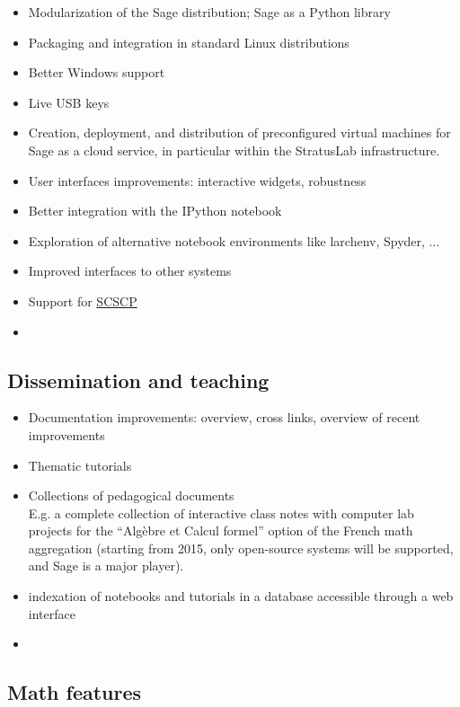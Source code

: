 \begin{itemize}
\item Modularization of the Sage distribution; Sage as a Python library
\item Packaging and integration in standard Linux distributions
\item Better Windows support
\item Live USB keys
\item Creation, deployment, and distribution of preconfigured virtual
  machines for Sage as a cloud service, in particular within the
  StratusLab infrastructure.
\item User interfaces improvements: interactive widgets, robustness
\item Better integration with the IPython notebook
\item Exploration of alternative notebook environments like larchenv,
  Spyder, ...
\item Improved interfaces to other systems
\item Support for \href{http://www.symbolic-computing.org/}{SCSCP}
\item {}
\end{itemize}

\subsection{Dissemination and teaching}

\begin{itemize}
\item Documentation improvements: overview, cross links, overview of
  recent improvements
\item Thematic tutorials
\item Collections of pedagogical documents\\
  E.g. a complete collection of interactive class notes with computer
  lab projects for the ``Algèbre et Calcul formel'' option of the
  French math aggregation (starting from 2015, only open-source
  systems will be supported, and Sage is a major player).
\item indexation of notebooks and tutorials in a database accessible through a
  web interface
\item {}
\end{itemize}

\subsection{Math features}


